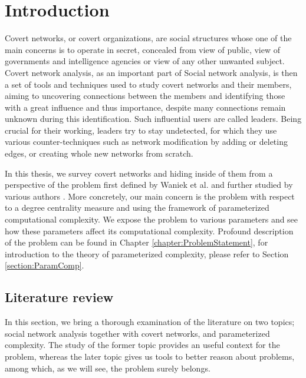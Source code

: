 \chapter*{Introduction}

\setcounter{page}{1}

Covert networks, or covert organizations, are social structures whose one of the main concerns is to operate in secret,
concealed from view of public, view of governments and intelligence agencies or view of any other unwanted subject.
Covert network analysis, as an important part of Social network analysis, is then a set of tools and techniques used to study
covert networks and their members, aiming to uncovering connections between the members and identifying those with a great
influence and thus importance, despite many connections remain unknown during this identification.
Such influential users are called leaders.
Being crucial for their working, leaders try to stay undetected, for which they use various counter-techniques such as
network modification by adding or deleting edges, or creating whole new networks from scratch.

In this thesis, we survey covert networks and hiding inside of them from a perspective of the \HL problem first defined by
Waniek et al. \cite{Waniek2017} and further studied by various authors \cite{Dey2019,Waniek2021,Mohan2023}.
More concretely, our main concern is the \HL problem with respect to a degree centrality measure
and using the framework of parameterized computational complexity.
We expose the problem to various parameters and see how these parameters affect its computational complexity.
Profound description of the \HL problem can be found in Chapter \ref{chapter:ProblemStatement}, for introduction to
the theory of parameterized complexity, please refer to Section \ref{section:ParamComp}.


\section{Literature review}

In this section, we bring a thorough examination of the literature on two topics;
social network analysis together with covert networks, and parameterized complexity.
The study of the former topic provides an useful context for the \HL problem, whereas
the later topic gives us tools to better reason about \NPh problems, among which, as we will see, the \HL problem surely belongs.

